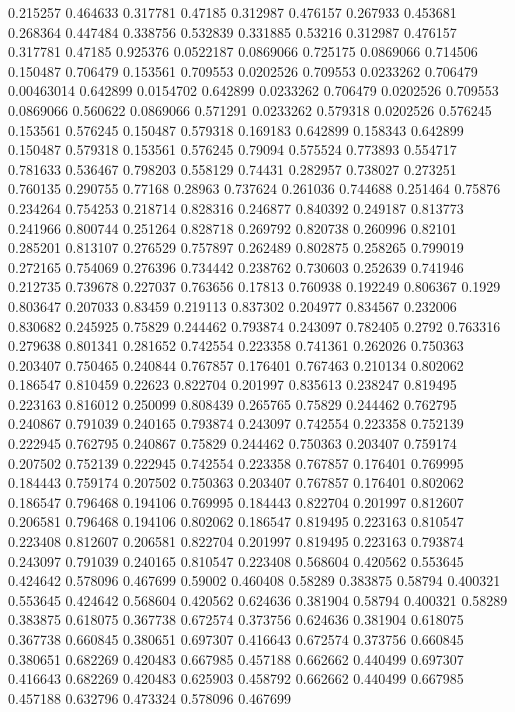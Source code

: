 0.215257 0.464633
0.317781 0.47185
0.312987 0.476157
0.267933 0.453681
0.268364 0.447484
0.338756 0.532839
0.331885 0.53216
0.312987 0.476157
0.317781 0.47185
0.925376 0.0522187
0.0869066 0.725175
0.0869066 0.714506
0.150487 0.706479
0.153561 0.709553
0.0202526 0.709553
0.0233262 0.706479
0.00463014 0.642899
0.0154702 0.642899
0.0233262 0.706479
0.0202526 0.709553
0.0869066 0.560622
0.0869066 0.571291
0.0233262 0.579318
0.0202526 0.576245
0.153561 0.576245
0.150487 0.579318
0.169183 0.642899
0.158343 0.642899
0.150487 0.579318
0.153561 0.576245
0.79094 0.575524
0.773893 0.554717
0.781633 0.536467
0.798203 0.558129
0.74431 0.282957
0.738027 0.273251
0.760135 0.290755
0.77168 0.28963
0.737624 0.261036
0.744688 0.251464
0.75876 0.234264
0.754253 0.218714
0.828316 0.246877
0.840392 0.249187
0.813773 0.241966
0.800744 0.251264
0.828718 0.269792
0.820738 0.260996
0.82101 0.285201
0.813107 0.276529
0.757897 0.262489
0.802875 0.258265
0.799019 0.272165
0.754069 0.276396
0.734442 0.238762
0.730603 0.252639
0.741946 0.212735
0.739678 0.227037
0.763656 0.17813
0.760938 0.192249
0.806367 0.1929
0.803647 0.207033
0.83459 0.219113
0.837302 0.204977
0.834567 0.232006
0.830682 0.245925
0.75829 0.244462
0.793874 0.243097
0.782405 0.2792
0.763316 0.279638
0.801341 0.281652
0.742554 0.223358
0.741361 0.262026
0.750363 0.203407
0.750465 0.240844
0.767857 0.176401
0.767463 0.210134
0.802062 0.186547
0.810459 0.22623
0.822704 0.201997
0.835613 0.238247
0.819495 0.223163
0.816012 0.250099
0.808439 0.265765
0.75829 0.244462
0.762795 0.240867
0.791039 0.240165
0.793874 0.243097
0.742554 0.223358
0.752139 0.222945
0.762795 0.240867
0.75829 0.244462
0.750363 0.203407
0.759174 0.207502
0.752139 0.222945
0.742554 0.223358
0.767857 0.176401
0.769995 0.184443
0.759174 0.207502
0.750363 0.203407
0.767857 0.176401
0.802062 0.186547
0.796468 0.194106
0.769995 0.184443
0.822704 0.201997
0.812607 0.206581
0.796468 0.194106
0.802062 0.186547
0.819495 0.223163
0.810547 0.223408
0.812607 0.206581
0.822704 0.201997
0.819495 0.223163
0.793874 0.243097
0.791039 0.240165
0.810547 0.223408
0.568604 0.420562
0.553645 0.424642
0.578096 0.467699
0.59002 0.460408
0.58289 0.383875
0.58794 0.400321
0.553645 0.424642
0.568604 0.420562
0.624636 0.381904
0.58794 0.400321
0.58289 0.383875
0.618075 0.367738
0.672574 0.373756
0.624636 0.381904
0.618075 0.367738
0.660845 0.380651
0.697307 0.416643
0.672574 0.373756
0.660845 0.380651
0.682269 0.420483
0.667985 0.457188
0.662662 0.440499
0.697307 0.416643
0.682269 0.420483
0.625903 0.458792
0.662662 0.440499
0.667985 0.457188
0.632796 0.473324
0.578096 0.467699
